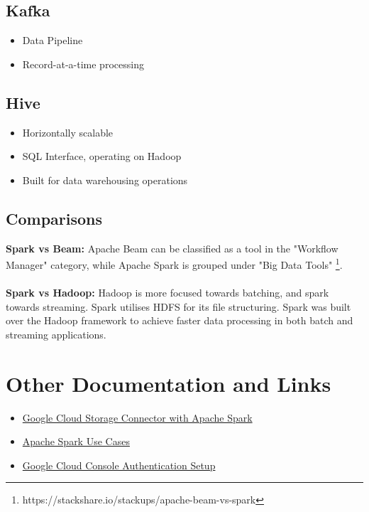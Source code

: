\documentclass[english]{article}
\begin{document}
\subsection{Kafka}
\begin{itemize}
\item Data Pipeline
\item Record-at-a-time processing
\end{itemize}
\subsection{Hive}
\begin{itemize}
\item Horizontally scalable
\item SQL Interface, operating on Hadoop
\item Built for data warehousing operations
\end{itemize}
\subsection{Comparisons}
\textbf{Spark vs Beam:} Apache Beam can be classified as a tool in the "Workflow Manager" category, while Apache Spark is grouped under "Big Data Tools" \footnote{https://stackshare.io/stackups/apache-beam-vs-spark}.\\\\
\textbf{Spark vs Hadoop:} Hadoop is more focused towards batching, and spark towards streaming. Spark utilises HDFS for its file structuring. Spark was built over the Hadoop framework to achieve faster data processing in both batch and streaming applications.
\section{Other Documentation and Links}
\begin{itemize}
\item \href{https://cloud.google.com/dataproc/docs/tutorials/gcs-connector-spark-tutorial}{Google Cloud Storage Connector with Apache Spark}
\item \href{https://www.qubole.com/blog/apache-spark-use-cases/}{Apache Spark Use Cases}
\item \href{https://cloud.google.com/docs/authentication/getting-started}{Google Cloud Console Authentication Setup}
\end{itemize}
\end{document}
